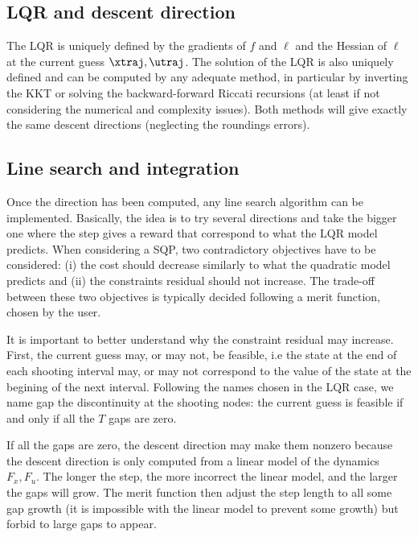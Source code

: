 \documentclass[10pt,a4paper]{article}
\begin{document}
\subsection{LQR and descent direction}
The LQR is uniquely defined by the gradients of $f$ and $\ell$ and the Hessian of $\ell$ at the current guess $\xtraj,\utraj$.
The solution of the LQR is also uniquely defined and can be computed by any adequate method, in particular by inverting the KKT or solving the backward-forward Riccati recursions (at least if not considering the numerical and complexity issues).
Both methods will give exactly the same descent directions (neglecting the roundings errors).

\subsection{Line search and integration}
Once the direction has been computed, any line search algorithm can be implemented.
Basically, the idea is to try several directions and take the bigger one where the step gives a reward that correspond to what the LQR model predicts.
When considering a SQP, two contradictory objectives have to be considered: (i) the cost should decrease similarly to what the quadratic model predicts and (ii) the constraints residual should not increase.
The trade-off between these two objectives is typically decided following a merit function, chosen by the user.

It is important to better understand why the constraint residual may increase.
First, the current guess may, or may not, be feasible, i.e the state at the end of each shooting interval may, or may not correspond to the value of the state at the begining of the next interval.
Following the names chosen in the LQR case, we name gap the discontinuity at the shooting nodes: the current guess is feasible if and only if all the $T$ gaps are zero.

If all the gaps are zero, the descent direction may make them nonzero because the descent direction is only computed from a linear model of the dynamics $F_x,F_u$.
The longer the step, the more incorrect the linear model, and the larger the gaps will grow.
The merit function then adjust the step length to all some gap growth (it is impossible with the linear model to prevent some growth) but forbid to large gaps to appear.
\end{document}
